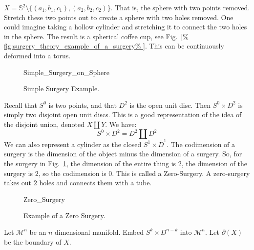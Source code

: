 \documentclass[crop=false,class=book,oneside]{standalone}
\begin{document}
            $X=\mathbb{S}^{2}\setminus%
             \{(a_{1},b_{1},c_{1}),(a_{2},b_{2},c_{2})\}$.
            That is, the sphere with two points removed.
            Stretch these two points out to create a sphere
            with two holes removed. One could imagine taking
            a hollow cylinder and stretching it to connect
            the two holes in the sphere. The result is a
            spherical coffee cup, see
            Fig.~\ref{%
                fig:surgery_theory_example_of_a_surgery%
            }.
            This can be continuously deformed into a torus.
            \begin{figure}[H]
                \centering
                \captionsetup{type=figure}
                
                          {Simple_Surgery_on_Sphere}
                \caption{Simple Surgery Example.}
                \label{fig:surgery_theory_example_of_a_surgery}
            \end{figure}
            Recall that $S^{0}$ is two points, and that
            $D^{2}$ is the open unit disc. Then $S^{0}\times D^{2}$
            is simply two disjoint open unit discs. This is a good
            representation of the idea of the disjoint union,
            denoted $X\coprod Y$. We have:
            \begin{equation*}
                S^{0}\times{D^{2}}=D^{2}\coprod{D^{2}}
            \end{equation*}
            We can also represent a cylinder as the closed
            $S^{1}\times \overline{D}^{1}$. The codimension
            of a surgery is the dimension of the object minus
            the dimension of a surgery. So, for the surgery
            in Fig.~\ref{fig:surgery_theory_example_of_a_surgery},
            the dimension of the entire thing is $2$, the dimension
            of the surgery is $2$, so the codimension is $0$.
            This is called a Zero-Surgery. A zero-surgery takes
            out $2$ holes and connects them with a tube.
            \begin{figure}[H]
                \centering
                \captionsetup{type=figure}
                {Zero_Surgery}
                \caption{Example of a Zero Surgery.}
                \label{fig:surgery_theory_a_zero_surgery}
            \end{figure}
            Let $\mathcal{M}^{n}$ be an $n$ dimensional manifold.
            Embed
            $S^{k}\times D^{n-k}$ into $\mathcal{M}^{n}$.
            Let $\partial(X)$ be the boundary of $X$.
\end{document}
